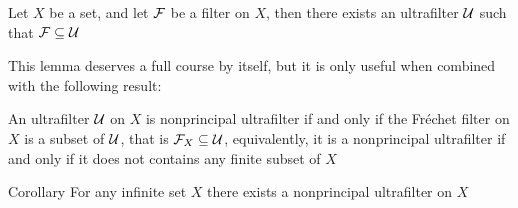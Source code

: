 	\begin{frame}
		\begin{lemma}
			Let $X$ be a set, and let $\mathcal{F}$ be a filter on $X$, then there exists an ultrafilter $\mathcal{U}$ such that $\mathcal{F}\subseteq\mathcal{U}$
		\end{lemma}\pause
		This lemma deserves a full course by itself, but it is only useful when combined with the following result:
		\begin{lemma}
			An ultrafilter $\mathcal{U}$ on $X$ is nonprincipal ultrafilter if and only if the Fréchet filter on $X$ is a subset of $\mathcal{U}$, that is $\mathcal{F}_X\subseteq\mathcal{U}$, equivalently, it is a nonprincipal ultrafilter if and only if it does not contains any finite subset of $X$
		\end{lemma}\pause
		\begin{block}{Corollary}
			For any infinite set $X$ there exists a nonprincipal ultrafilter on $X$
		\end{block}
	\end{frame}
